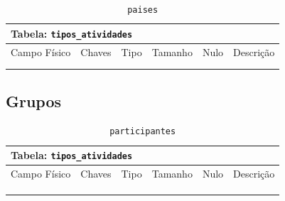 \documentclass[12pt,a4paper]{article}
\begin{document}
\begin{center}
\begin{table}[h!]
	\caption{\texttt{paises}}
	\label{tabela:paises}
	\begin{tabular}{|p{2.5cm}|p{1cm}|p{1.25cm}|p{1.75cm}|p{1.25cm}|p{5cm}|}\hline	
		\multicolumn{6}{|p{16cm}|}{\cellcolor{cinzaClaro}  \centering Tabela: \texttt{tipos\_atividades}} \\ \hline %
		{\small Campo Físico}   & {\small Chaves} & {\small Tipo} & {\small Tamanho} & {\small Nulo} & {\small Descrição}\\\hline %
		
		{\tiny } & {\tiny } & {\tiny } & {\tiny } & {\tiny } &{\tiny }\\\hline
		{\tiny } & {\tiny } & {\tiny } & {\tiny } & {\tiny } &{\tiny }\\\hline
	
			
	\end{tabular}
\end{table}	
\end{center}

\subsection{Grupos}


\begin{center}
\begin{table}[h!]
	\caption{\texttt{participantes}}
	\label{tabela:participantes}
	\begin{tabular}{|p{2.5cm}|p{1cm}|p{1.25cm}|p{1.75cm}|p{1.25cm}|p{5cm}|}\hline	
		\multicolumn{6}{|p{16cm}|}{\cellcolor{cinzaClaro}  \centering Tabela: \texttt{tipos\_atividades}} \\ \hline %
		{\small Campo Físico}   & {\small Chaves} & {\small Tipo} & {\small Tamanho} & {\small Nulo} & {\small Descrição}\\\hline %
		
		{\tiny } & {\tiny } & {\tiny } & {\tiny } & {\tiny } &{\tiny }\\\hline
		{\tiny } & {\tiny } & {\tiny } & {\tiny } & {\tiny } &{\tiny }\\\hline
		{\tiny } & {\tiny } & {\tiny } & {\tiny } & {\tiny } &{\tiny }\\\hline
			
	\end{tabular}
\end{table}	
\end{center}
\end{document}
